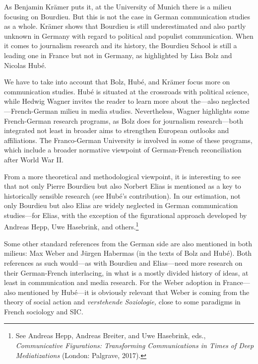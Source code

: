 \documentclass{tufte-handout}
\begin{document}
As Benjamin Krämer puts it, at the University of Munich there is a
milieu focusing on Bourdieu. But this is not the case in German
communication studies as a whole. Krämer shows that Bourdieu is still
underestimated and also partly unknown in Germany with regard to
political and populist communication. When it comes to journalism
research and its history, the Bourdieu School is still a leading one in
France but not in Germany, as highlighted by Lisa Bolz and Nicolas Hubé.

We have to take into account that Bolz, Hubé, and Krämer focus more on
communication studies. Hubé is situated at the crossroads with political
science, while Hedwig Wagner invites the reader to learn more about
the---also neglected---French-German milieu in media studies.
Nevertheless, Wagner highlights some French-German research programs, as
Bolz does for journalism research---both integrated not least in broader
aims to strengthen European outlooks and affiliations. The Franco-German
University is involved in some of these programs, which include a
broader normative viewpoint of German-French reconciliation after World
War II.

\enlargethispage{-\baselineskip}

From a more theoretical and methodological viewpoint, it is interesting
to see that not only Pierre Bourdieu but also Norbert Elias is mentioned
as a key to historically sensible research (see Hubé's contribution). In
our estimation, not only Bourdieu but also Elias are widely neglected in
German communication studies---for Elias, with the exception of the
figurational approach developed by Andreas Hepp, Uwe Hasebrink, and
others.\footnote{See Andreas Hepp, Andreas Breiter, and Uwe Hasebrink,
  eds., \emph{Communicative Figurations: Transforming Communications in
  Times of Deep Mediatizations} (London: Palgrave, 2017).}

Some other standard references from the German side are also mentioned
in both milieus: Max Weber and Jürgen Habermas (in the texts of Bolz and
Hubé). Both references as such would---as with Bourdieu and Elias---need
more research on their German-French interlacing, in what is a mostly
divided history of ideas, at least in communication and media research.
For the Weber adoption in France---also mentioned by Hubé---it is
obviously relevant that Weber is coming from the theory of social action
and \emph{verstehende Soziologie,} close to some paradigms in French
sociology and SIC.
\end{document}
